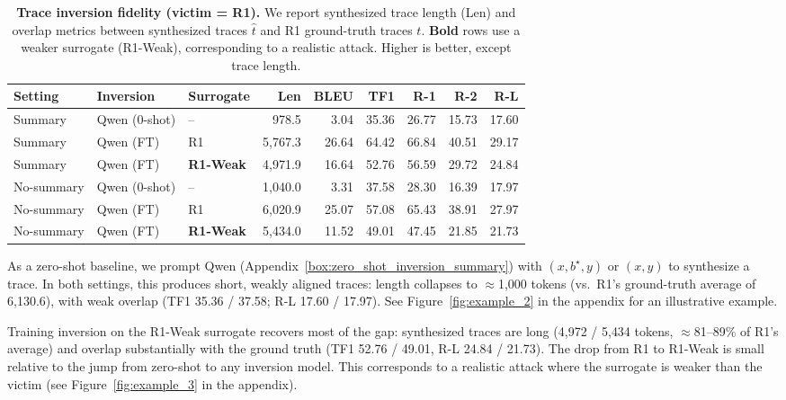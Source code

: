 \documentclass{article}
\newcommand\shortsection[1]{\vspace{.75ex}{\noindent\bf #1.}}
\begin{document}
\begin{table}[t]
  \centering
  \setlength{\belowcaptionskip}{8pt}
  \caption{\textbf{Trace inversion fidelity (victim = R1).}
  We report synthesized trace length (Len) and overlap metrics between synthesized traces $\hat{t}$ and R1 ground-truth traces $t$.
  \textbf{Bold} rows use a weaker surrogate (R1-Weak), corresponding to a realistic attack. Higher is better, except trace length.}
  \label{tab:inversion}
  \small
  \begin{tabular}{lllrrrrrr}
    \toprule
    \textbf{Setting} & \textbf{Inversion} & \textbf{Surrogate} & \textbf{Len} & \textbf{BLEU} & \textbf{TF1} & \textbf{R-1} & \textbf{R-2} & \textbf{R-L} \\
    \midrule
    Summary & Qwen (0-shot) & -- & 978.5 & 3.04 & 35.36 & 26.77 & 15.73 & 17.60 \\
    Summary & Qwen (FT) & R1 & 5{,}767.3 & 26.64 & 64.42 & 66.84 & 40.51 & 29.17 \\
    Summary & Qwen (FT) & \textbf{R1-Weak} & 4{,}971.9 & 16.64 & 52.76 & 56.59 & 29.72 & 24.84 \\
    \midrule
    No-summary & Qwen (0-shot) & -- & 1{,}040.0 & 3.31 & 37.58 & 28.30 & 16.39 & 17.97 \\
    No-summary  & Qwen (FT) & R1 & 6{,}020.9 & 25.07 & 57.08 & 65.43 & 38.91 & 27.97 \\
    No-summary  & Qwen (FT) & \textbf{R1-Weak} & 5{,}434.0 & 11.52 & 49.01 & 47.45 & 21.85 & 21.73 \\
    \bottomrule
  \end{tabular}
  \vskip -0.1in
\end{table}

\shortsection{Prompting alone is insufficient} As a zero-shot baseline, we prompt Qwen (Appendix~\ref{box:zero_shot_inversion_summary}) with $(x, b^\star, y)$ or $(x, y)$ to synthesize a trace.  In both settings, this produces short, weakly aligned traces: length collapses to $\approx$1{,}000 tokens (vs.\ R1's ground-truth average of 6{,}130.6), with weak overlap (TF1 35.36 / 37.58; R-L 17.60 / 17.97). See Figure~\ref{fig:example_2} in the appendix for an illustrative example.


\shortsection{Weaker surrogate is nearly as effective} Training inversion on the R1-Weak surrogate recovers most of the gap: synthesized traces are long (4{,}972 / 5{,}434 tokens, $\approx$81--89\% of R1's average) and overlap substantially with the ground truth (TF1 52.76 / 49.01, R-L 24.84 / 21.73).  The drop from R1 to R1-Weak is small relative to the jump from zero-shot to any inversion model.  This corresponds to a realistic attack where the surrogate is weaker than the victim (see Figure~\ref{fig:example_3} in the appendix).
\end{document}
